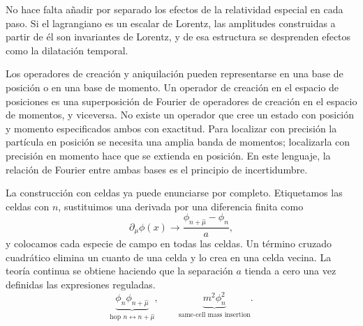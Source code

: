 No hace falta añadir por separado los efectos de la relatividad especial en cada paso. Si el lagrangiano es un escalar de Lorentz, las amplitudes construidas a partir de él son invariantes de Lorentz, y de esa estructura se desprenden efectos como la dilatación temporal.

\begin{classroomqa}
\end{classroomqa}

Los operadores de creación y aniquilación pueden representarse en una base de posición o en una base de momento. Un operador de creación en el espacio de posiciones es una superposición de Fourier de operadores de creación en el espacio de momentos, y viceversa. No existe un operador que cree un estado con posición y momento especificados ambos con exactitud. Para localizar con precisión la partícula en posición se necesita una amplia banda de momentos; localizarla con precisión en momento hace que se extienda en posición. En este lenguaje, la relación de Fourier entre ambas bases es el principio de incertidumbre.

\begin{classroomqa}
\end{classroomqa}

La construcción con celdas ya puede enunciarse por completo. Etiquetamos las celdas con \(n\), sustituimos una derivada por una diferencia finita como
\begin{equation}
\partial_\mu\phi(x)
\longrightarrow
\frac{\phi_{n+\hat\mu}-\phi_n}{a},
\end{equation}
y colocamos cada especie de campo en todas las celdas. Un término cruzado cuadrático elimina un cuanto de una celda y lo crea en una celda vecina. La teoría continua se obtiene haciendo que la separación \(a\) tienda a cero una vez definidas las expresiones reguladas.
\begin{equation}
\underbrace{\phi_n\phi_{n+\hat\mu}}_{\text{hop }n\leftrightarrow n+\hat\mu},
\qquad
\underbrace{m^2\phi_n^2}_{\text{same-cell mass insertion}}.
\end{equation}

